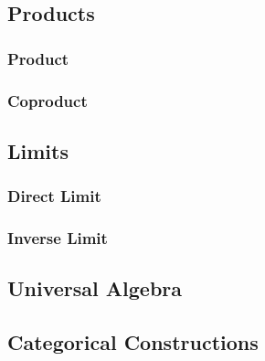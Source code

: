 \subsection{Products}

\subsubsection*{Product}

\subsubsection*{Coproduct}


\subsection{Limits}

\subsubsection*{Direct Limit}

\subsubsection*{Inverse Limit}


\subsection{Universal Algebra}


\subsection{Categorical Constructions}

